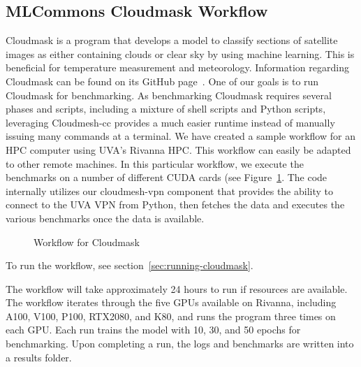 
\subsection{MLCommons Cloudmask Workflow}
\label{cloudmask-workflow}

Cloudmask is a program that develops a model to classify sections of
satellite images as either containing clouds or clear sky by using
machine learning. This is beneficial for temperature measurement and
meteorology.  Information regarding Cloudmask can be found on its
GitHub page~\cite{www-cloudmask}.
One of our goals is to run Cloudmask for benchmarking.
As benchmarking Cloudmask requires
several phases and scripts, including a mixture of shell scripts and
Python scripts, leveraging Cloudmesh-cc provides a much easier runtime
instead of manually issuing many commands at a terminal.
We have created a sample workflow for an HPC
computer using UVA's Rivanna HPC. 
This workflow can easily be adapted to other remote machines. In this
particular workflow, we execute the benchmarks on a number of different
CUDA cards (see Figure~\ref{fig:cloudmaskwf}. The code internally utilizes
our cloudmesh-vpn component that provides the ability to
connect to the UVA VPN from Python, then fetches the data and executes
the various benchmarks once the data is available.


\begin{figure}[htb]
  \vspace{-1cm}
  \caption{Workflow for Cloudmask}\label{fig:cloudmaskwf}
\end{figure}

To run the workflow, see section~\ref{sec:running-cloudmask}.

The workflow will take approximately 24 hours to run if resources are
available. The workflow iterates through the five GPUs available on
Rivanna, including A100, V100, P100, RTX2080, and K80, and runs the program
three times on each GPU. Each run trains the model with 10, 30, and 50
epochs for benchmarking.  Upon completing a run, the logs and
benchmarks are written into a results folder.

